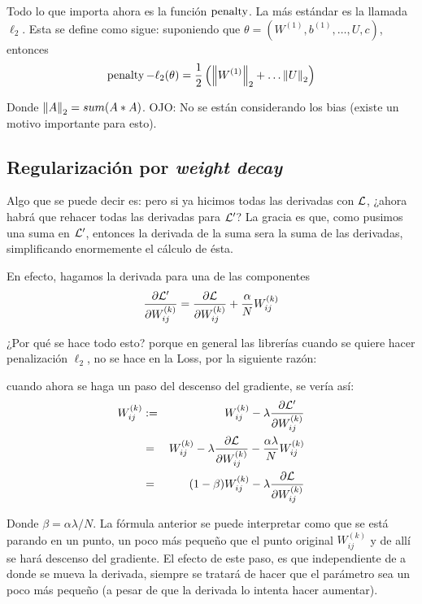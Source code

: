 Todo lo que importa ahora es la función $\operatorname{penalty}$. La más estándar es la llamada $\ell_2$. Esta se define como sigue: suponiendo que $\theta = (W^{(1)}, b^{(1)}, \ldots, U, c)$, entonces
\begin{equation*}
    \operatorname{penalty}-\ell_2(\theta) = \frac{1}{2} \left(
    \left\|W^{(1)}\right\|_2 + \ldots \left\|U\right\|_2
    \right)
\end{equation*}

Donde $\left\|A\right\|_2 = sum(A \ast A)$. OJO: No se están considerando los bias (existe un motivo importante para esto).

\subsection{Regularización por \textit{weight decay}}

Algo que se puede decir es: pero si ya hicimos todas las derivadas con $\mathcal{L}$, ¿ahora habrá que rehacer todas las derivadas para $\mathcal{L}'$? La gracia es que, como pusimos una suma en $\mathcal{L}'$, entonces la derivada de la suma sera la suma de las derivadas, simplificando enormemente el cálculo de ésta.

En efecto, hagamos la derivada para una de las componentes
\begin{eqnarray*}
\frac{\partial \mathcal{L}'}{\partial W^{(k)}_{ij}}
= \frac{\partial \mathcal{L}}{\partial W^{(k)}_{ij}} + \frac{\alpha}{N} W^{(k)}_{ij}
\end{eqnarray*}

¿Por qué se hace todo esto? porque en general las librerías cuando se quiere hacer penalización $\ell_2$, no se hace en la Loss, por la siguiente razón:

cuando ahora se haga un paso del descenso del gradiente, se vería así:
\begin{eqnarray*}
W^{(k)}_{ij} &:=& W^{(k)}_{ij} - \lambda \frac{\partial \mathcal{L}'}{\partial W^{(k)}_{ij}}\\
&=&  W^{(k)}_{ij} - \lambda \frac{\partial \mathcal{L}}{\partial W^{(k)}_{ij}} - \frac{\alpha \lambda}{N} W^{(k)}_{ij} \\
&=&  (1 - \beta) W^{(k)}_{ij} - \lambda \frac{\partial \mathcal{L}}{\partial W^{(k)}_{ij}}
\end{eqnarray*}

Donde $\beta = {\alpha \lambda}/{N}$. La fórmula anterior se puede interpretar como que se está parando en un punto, un poco más pequeño que el punto original $W^{(k)}_{ij}$ y de allí se hará descenso del gradiente. El efecto de este paso, es que independiente de a donde se mueva la derivada, siempre se tratará de hacer que el parámetro sea un poco más pequeño (a pesar de que la derivada lo intenta hacer aumentar).

